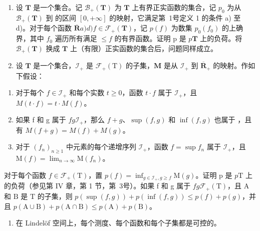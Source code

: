 \begin{enumerate}
\def\labelenumi{\arabic{enumi})}
\setcounter{enumi}{4}
\item
  设 \(\mathbf{T}\) 是一个集合。记 \(\mathcal{B}_{+}(\mathbf{T})\) 为 \(\mathbf{T}\) 上有界正实函数的集合，记 \(p_0\) 为从 \(\mathcal{B}_{+}(\mathbf{T})\) 到  的区间 \([0, +\infty]\) 的映射，它满足第~1号定义 1 的条件 a) 至 d)。对于每个函数 \(\overline{\mathbf{R}}\)\(a)\)\(d)\)\(f \in \mathcal{F}_{+}(\mathbf{T})\)，记 \(p(f)\) 为数集 \(p_0(f_0)\) 的上确界，其中 \(f_0\) 遍历所有满足 \(\leqslant f\) 的有界函数。证明 p 是 \(p\)\(\mathbf{T}\) 上的负荷。将 \(\mathcal{B}_{+}(\mathbf{T})\) 换成 \(\mathbf{T}\) 上（有限）正实函数的集合后，问题同样成立。
\item
  设 \(\mathbf{T}\) 是一个集合，\(\mathcal{I}_{+}\) 是 \(\mathcal{F}_{+}(\mathrm{T})\) 的子集，\(\mathbf{M}\) 是从 \(\mathcal{I}_{+}\) 到 \(\overline{\mathbf{R}}_{+}\) 的映射。作如下假设：
\end{enumerate}

\begin{enumerate}
\def\labelenumi{\alph{enumi})}
\item
  对于每个 \(f \in \mathcal{I}_+\) 和每个实数 \(t \geqslant 0\)，函数 \(t \cdot f\) 属于 \(\mathcal{I}_+\)，且 \(M(t \cdot f) = t \cdot M(f)\)。
\item
  如果 f 和 g 属于 \(f\)\(g\)\(\mathcal{I}_+\)，那么 \(f + g\)、\(\sup(f, g)\) 和 \(\inf(f, g)\) 也属于 ，且有 \(M(f + g) = M(f) + M(g)\)。
\item
  对于 \((f_n)_{n\geqslant 1}\) 中元素的每个递增序列 \(\mathcal{I}_+\)，函数 \(f = \sup f_n\) 属于 \(\mathcal{I}_+\)，且 \(\mathrm{M}(f) = \lim_{n\to \infty}\mathrm{M}(f_n)\)。
\end{enumerate}

对于每个函数 \(f \in \mathcal{F}_{+}(\mathrm{T})\)，置 \(p(f) = \inf_{g \in \mathcal{I}_{+}, g \geqslant f} \mathrm{M}(g)\)。证明 p 是 \(p\)\(\mathrm{T}\) 上的负荷（参见第 IV 章，第 1 节，第~3号）。如果 f 和 g 属于 \(f\)\(g\)\(\mathcal{F}_{+}(\mathrm{T})\)，且 \(\mathrm{A}\) 和 \(\mathrm{B}\) 是 \(\mathrm{T}\) 的子集，则 \(p(\sup(f, g)) + p(\inf(f, g)) \leqslant p(f) + p(g)\)，并且 \(p(\mathrm{A} \cup \mathrm{B}) + p(\mathrm{A} \cap \mathrm{B}) \leqslant p(\mathrm{A}) + p(\mathrm{B})\)。

\begin{enumerate}
\def\labelenumi{\arabic{enumi})}
\setcounter{enumi}{6}
\tightlist
\item
  在 Lindelöf 空间上，每个测度、每个函数和每个子集都是可控的。
\end{enumerate}

